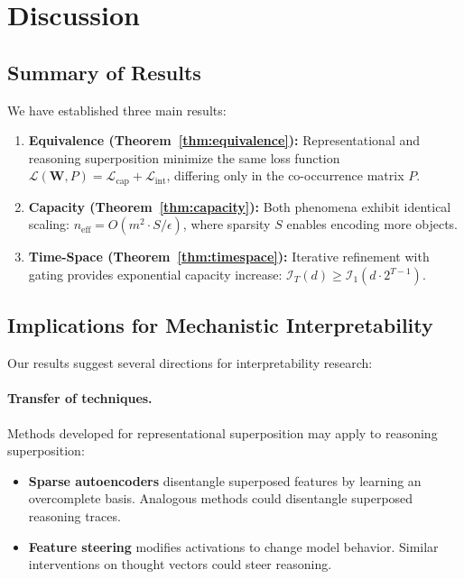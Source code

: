 \section{Discussion}
\label{sec:discussion}

\subsection{Summary of Results}

We have established three main results:

\begin{enumerate}
    \item \textbf{Equivalence (Theorem~\ref{thm:equivalence}):} Representational and reasoning superposition minimize the same loss function $\mathcal{L}(\mathbf{W}, P) = \mathcal{L}_{\text{cap}} + \mathcal{L}_{\text{int}}$, differing only in the co-occurrence matrix $P$.

    \item \textbf{Capacity (Theorem~\ref{thm:capacity}):} Both phenomena exhibit identical scaling: $n_{\text{eff}} = O(m^2 \cdot S / \epsilon)$, where sparsity $S$ enables encoding more objects.

    \item \textbf{Time-Space (Theorem~\ref{thm:timespace}):} Iterative refinement with gating provides exponential capacity increase: $\mathcal{I}_T(d) \geq \mathcal{I}_1(d \cdot 2^{T-1})$.
\end{enumerate}

\subsection{Implications for Mechanistic Interpretability}

Our results suggest several directions for interpretability research:

\paragraph{Transfer of techniques.} Methods developed for representational superposition may apply to reasoning superposition:
\begin{itemize}
    \item \textbf{Sparse autoencoders} \citep{bricken2023monosemanticity} disentangle superposed features by learning an overcomplete basis. Analogous methods could disentangle superposed reasoning traces.
    \item \textbf{Feature steering} \citep{templeton2024scaling} modifies activations to change model behavior. Similar interventions on thought vectors could steer reasoning.
\end{itemize}

